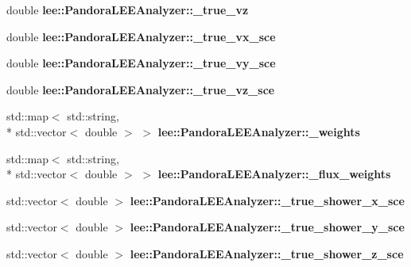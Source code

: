 \begin{DoxyCompactItemize}
\item 
\hypertarget{group__lee_gab2c80253d7af767bc7435a95b714d546}{double {\bfseries lee\-::\-Pandora\-L\-E\-E\-Analyzer\-::\-\_\-true\-\_\-vz}}\label{group__lee_gab2c80253d7af767bc7435a95b714d546}

\item 
\hypertarget{group__lee_ga8a638838ed9a1cde42fd00a198c3521b}{double {\bfseries lee\-::\-Pandora\-L\-E\-E\-Analyzer\-::\-\_\-true\-\_\-vx\-\_\-sce}}\label{group__lee_ga8a638838ed9a1cde42fd00a198c3521b}

\item 
\hypertarget{group__lee_ga1ea9a05e0b69aca1c22072cae8482b81}{double {\bfseries lee\-::\-Pandora\-L\-E\-E\-Analyzer\-::\-\_\-true\-\_\-vy\-\_\-sce}}\label{group__lee_ga1ea9a05e0b69aca1c22072cae8482b81}

\item 
\hypertarget{group__lee_ga5ac99bc027e85044950f2f502d3fffb0}{double {\bfseries lee\-::\-Pandora\-L\-E\-E\-Analyzer\-::\-\_\-true\-\_\-vz\-\_\-sce}}\label{group__lee_ga5ac99bc027e85044950f2f502d3fffb0}

\item 
\hypertarget{group__lee_ga114a52d8c3bfec336e931f1d4d8e6687}{std\-::map$<$ std\-::string, \\*
std\-::vector$<$ double $>$ $>$ {\bfseries lee\-::\-Pandora\-L\-E\-E\-Analyzer\-::\-\_\-weights}}\label{group__lee_ga114a52d8c3bfec336e931f1d4d8e6687}

\item 
\hypertarget{group__lee_ga5d5ebf6e8ca021c662ee2589ebf13f46}{std\-::map$<$ std\-::string, \\*
std\-::vector$<$ double $>$ $>$ {\bfseries lee\-::\-Pandora\-L\-E\-E\-Analyzer\-::\-\_\-flux\-\_\-weights}}\label{group__lee_ga5d5ebf6e8ca021c662ee2589ebf13f46}

\item 
\hypertarget{group__lee_ga5a4c4d805d124adaddb51a03be0af692}{std\-::vector$<$ double $>$ {\bfseries lee\-::\-Pandora\-L\-E\-E\-Analyzer\-::\-\_\-true\-\_\-shower\-\_\-x\-\_\-sce}}\label{group__lee_ga5a4c4d805d124adaddb51a03be0af692}

\item 
\hypertarget{group__lee_ga2509960b89cf002d160e0c298575eafd}{std\-::vector$<$ double $>$ {\bfseries lee\-::\-Pandora\-L\-E\-E\-Analyzer\-::\-\_\-true\-\_\-shower\-\_\-y\-\_\-sce}}\label{group__lee_ga2509960b89cf002d160e0c298575eafd}

\item 
\hypertarget{group__lee_gacb0f3d491c4acf888d0a787624627b57}{std\-::vector$<$ double $>$ {\bfseries lee\-::\-Pandora\-L\-E\-E\-Analyzer\-::\-\_\-true\-\_\-shower\-\_\-z\-\_\-sce}}\label{group__lee_gacb0f3d491c4acf888d0a787624627b57}


\end{DoxyCompactItemize}
